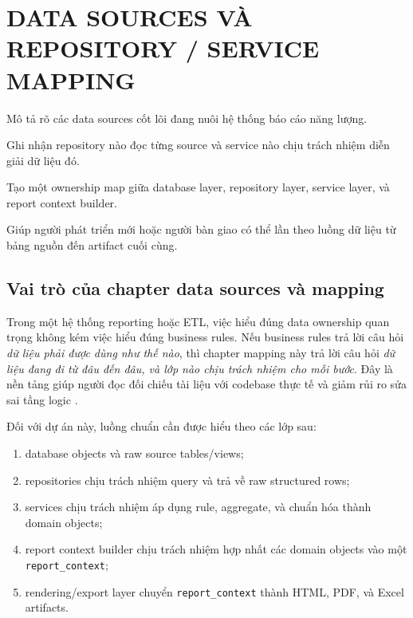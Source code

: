 \chapter{DATA SOURCES VÀ REPOSITORY / SERVICE MAPPING}

\begin{ChapterObjectives}
\item Mô tả rõ các data sources cốt lõi đang nuôi hệ thống báo cáo năng lượng.
\item Ghi nhận repository nào đọc từng source và service nào chịu trách nhiệm diễn giải dữ liệu đó.
\item Tạo một ownership map giữa database layer, repository layer, service layer, và report context builder.
\item Giúp người phát triển mới hoặc người bàn giao có thể lần theo luồng dữ liệu từ bảng nguồn đến artifact cuối cùng.
\end{ChapterObjectives}

\section{Vai trò của chapter data sources và mapping}

Trong một hệ thống reporting hoặc ETL, việc hiểu đúng data ownership quan trọng không kém việc hiểu đúng business rules. Nếu business rules trả lời câu hỏi \textit{dữ liệu phải được dùng như thế nào}, thì chapter mapping này trả lời câu hỏi \textit{dữ liệu đang đi từ đâu đến đâu, và lớp nào chịu trách nhiệm cho mỗi bước}. Đây là nền tảng giúp người đọc đối chiếu tài liệu với codebase thực tế và giảm rủi ro sửa sai tầng logic \cite{ref_kimball,ref_mysql,ref_python}.

Đối với dự án này, luồng chuẩn cần được hiểu theo các lớp sau:

\begin{enumerate}[label=-]
\item database objects và raw source tables/views;
\item repositories chịu trách nhiệm query và trả về raw structured rows;
\item services chịu trách nhiệm áp dụng rule, aggregate, và chuẩn hóa thành domain objects;
\item report context builder chịu trách nhiệm hợp nhất các domain objects vào một \texttt{report\_context};
\item rendering/export layer chuyển \texttt{report\_context} thành HTML, PDF, và Excel artifacts.
\end{enumerate}

